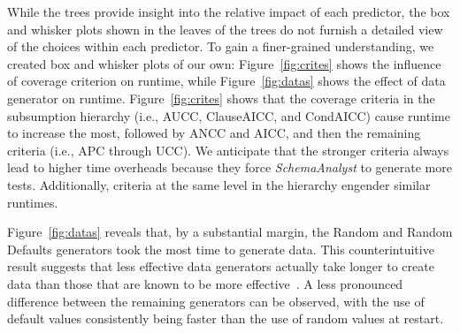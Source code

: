 
While the trees provide insight into the relative impact of each predictor, the
box and whisker plots shown in the leaves of the trees do not furnish a detailed view of the choices within each
predictor.  To gain a finer-grained understanding, we created box and whisker plots of our own:  Figure~\ref{fig:crites}
shows the influence of coverage criterion on runtime, while Figure~\ref{fig:datas} shows the effect of data generator
on runtime.  Figure~\ref{fig:crites} shows that the coverage criteria in the subsumption hierarchy 
(i.e., AUCC, ClauseAICC, and CondAICC) cause runtime to increase the most, followed by ANCC and AICC, and then the
remaining criteria (i.e., APC through UCC).  We anticipate that the stronger criteria always lead to higher time
overheads because they force {\em SchemaAnalyst} to generate more tests. Additionally, criteria at the same level in
the hierarchy engender similar runtimes.

Figure~\ref{fig:datas} reveals that, by a substantial margin, the Random and Random Defaults generators took the most
time to generate data. This counterintuitive result suggests that less effective data generators actually take longer to
create data than those that are known to be more effective~\cite{kapfhammer2013}.  A less pronounced difference between
the remaining generators can be observed, with the use of default values consistently being faster than the use of
random values at restart.

